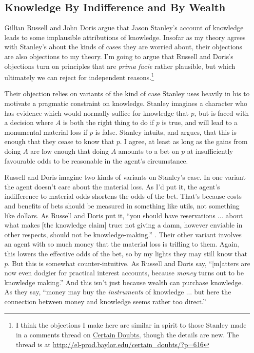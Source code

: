 \subsection{Knowledge By Indifference and By Wealth}

Gillian Russell and John Doris \citeyearpar{RussellDoris2008} argue that Jason Stanley's account of knowledge leads to some implausible attributions of knowledge. Insofar as my theory agrees with Stanley's about the kinds of cases they are worried about, their objections are also objections to my theory. I'm going to argue that Russell and Doris's objections turn on principles that are \textit{prima facie} rather plausible, but which ultimately we can reject for independent reasons.\footnote{I think the objections I make here are similar in spirit to those Stanley made in a comments thread on \href{http://el-prod.baylor.edu/certain_doubts/?p=616}{Certain Doubts}, though the details are new. The thread is at \href{http://el-prod.baylor.edu/certain_doubts/?p=616}{http://el-prod.baylor.edu/certain\_doubts/?p=616}}

Their objection relies on variants of the kind of case Stanley uses heavily in his \citeyearpar{Stanley2005-STAKAP} to motivate a pragmatic constraint on knowledge. Stanley imagines a character who has evidence which would normally suffice for knowledge that \(p\), but is faced with a decision where \(A\) is both the right thing to do if \(p\) is true, and will lead to a monumental material loss if \(p\) is false. Stanley intuits, and argues, that this is enough that they cease to know that \(p\). I agree, at least as long as the gains from doing \(A\) are low enough that doing \(A\) amounts to a bet on \(p\) at insufficiently favourable odds to be reasonable in the agent's circumstance.

Russell and Doris imagine two kinds of variants on Stanley's case. In one variant the agent doesn't care about the material loss. As I'd put it, the agent's indifference to material odds shortens the odds of the bet. That's because costs and benefits of bets should be measured in something like utils, not something like dollars. As Russell and Doris put it, ``you should have reservations ... about what makes [the knowledge claim] true: not giving a damn, however enviable in other respects, should not be knowledge-making.'' \citep[432]{RussellDoris2008}. Their other variant involves an agent with so much money that the material loss is trifling to them. Again, this lowers the effective odds of the bet, so by my lights they may still know that \(p\). But this is somewhat counter-intuitive. As Russell and Doris say, ``[m]atters are now even dodgier for practical interest accounts, because \textit{money} turns out to be knowledge making.'' \citep[433]{RussellDoris2008} And this isn't just because wealth can purchase knowledge. As they say, ``money may buy the \textit{instruments} of knowledge ... but here the connection between money and knowledge seems rather too direct.'' \citep[433]{RussellDoris2008}

